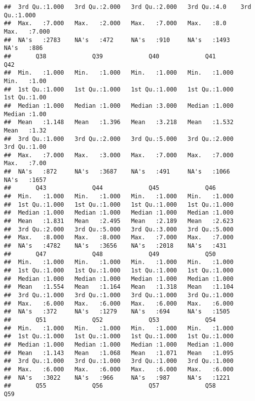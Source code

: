 \documentclass[
]{article}
\begin{document}
\begin{verbatim}
##  3rd Qu.:1.000   3rd Qu.:2.000   3rd Qu.:2.000   3rd Qu.:4.0    3rd Qu.:1.000  
##  Max.   :7.000   Max.   :2.000   Max.   :7.000   Max.   :8.0    Max.   :7.000  
##  NA's   :2783    NA's   :472     NA's   :910     NA's   :1493   NA's   :886    
##       Q38             Q39             Q40             Q41             Q42      
##  Min.   :1.000   Min.   :1.000   Min.   :1.000   Min.   :1.000   Min.   :1.00  
##  1st Qu.:1.000   1st Qu.:1.000   1st Qu.:1.000   1st Qu.:1.000   1st Qu.:1.00  
##  Median :1.000   Median :1.000   Median :3.000   Median :1.000   Median :1.00  
##  Mean   :1.148   Mean   :1.396   Mean   :3.218   Mean   :1.532   Mean   :1.32  
##  3rd Qu.:1.000   3rd Qu.:2.000   3rd Qu.:5.000   3rd Qu.:2.000   3rd Qu.:1.00  
##  Max.   :7.000   Max.   :3.000   Max.   :7.000   Max.   :7.000   Max.   :7.00  
##  NA's   :872     NA's   :3687    NA's   :491     NA's   :1066    NA's   :1657  
##       Q43             Q44             Q45             Q46       
##  Min.   :1.000   Min.   :1.000   Min.   :1.000   Min.   :1.000  
##  1st Qu.:1.000   1st Qu.:1.000   1st Qu.:1.000   1st Qu.:1.000  
##  Median :1.000   Median :1.000   Median :1.000   Median :1.000  
##  Mean   :1.831   Mean   :2.495   Mean   :2.189   Mean   :2.623  
##  3rd Qu.:2.000   3rd Qu.:5.000   3rd Qu.:3.000   3rd Qu.:5.000  
##  Max.   :8.000   Max.   :8.000   Max.   :7.000   Max.   :7.000  
##  NA's   :4782    NA's   :3656    NA's   :2018    NA's   :431    
##       Q47             Q48             Q49             Q50       
##  Min.   :1.000   Min.   :1.000   Min.   :1.000   Min.   :1.000  
##  1st Qu.:1.000   1st Qu.:1.000   1st Qu.:1.000   1st Qu.:1.000  
##  Median :1.000   Median :1.000   Median :1.000   Median :1.000  
##  Mean   :1.554   Mean   :1.164   Mean   :1.318   Mean   :1.104  
##  3rd Qu.:1.000   3rd Qu.:1.000   3rd Qu.:1.000   3rd Qu.:1.000  
##  Max.   :6.000   Max.   :6.000   Max.   :6.000   Max.   :6.000  
##  NA's   :372     NA's   :1279    NA's   :694     NA's   :1505   
##       Q51             Q52             Q53             Q54       
##  Min.   :1.000   Min.   :1.000   Min.   :1.000   Min.   :1.000  
##  1st Qu.:1.000   1st Qu.:1.000   1st Qu.:1.000   1st Qu.:1.000  
##  Median :1.000   Median :1.000   Median :1.000   Median :1.000  
##  Mean   :1.143   Mean   :1.068   Mean   :1.071   Mean   :1.095  
##  3rd Qu.:1.000   3rd Qu.:1.000   3rd Qu.:1.000   3rd Qu.:1.000  
##  Max.   :6.000   Max.   :6.000   Max.   :6.000   Max.   :6.000  
##  NA's   :3022    NA's   :966     NA's   :987     NA's   :1221   
##       Q55             Q56             Q57             Q58            Q59       

\end{verbatim}
\end{document}
